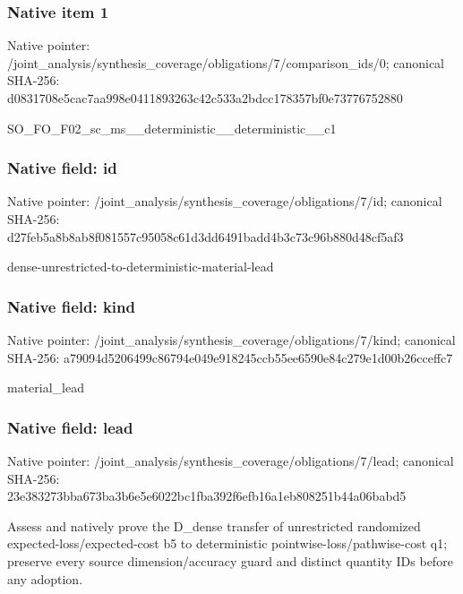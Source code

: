 \documentclass[10pt,a4paper]{article}
\begin{document}
\subsubsection{Native item 1}
Native pointer: /joint\_\allowbreak{}analysis/synthesis\_\allowbreak{}coverage/obligations/7/comparison\_\allowbreak{}ids/0; canonical SHA-256: d0831708e5cac7aa998e0411893263c42c533a2bdcc178357bf0e73776752880

\begingroup\raggedright\sloppy SO\_\allowbreak{}FO\_\allowbreak{}F02\_\allowbreak{}sc\_\allowbreak{}ms\_\allowbreak{}\_\allowbreak{}deterministic\_\allowbreak{}\_\allowbreak{}deterministic\_\allowbreak{}\_\allowbreak{}c1\par\endgroup

\subsubsection{Native field: id}
Native pointer: /joint\_\allowbreak{}analysis/synthesis\_\allowbreak{}coverage/obligations/7/id; canonical SHA-256: d27feb5a8b8ab8f081557c95058c61d3dd6491badd4b3c73c96b880d48cf5af3

\begingroup\raggedright\sloppy dense-unrestricted-to-deterministic-material-lead\par\endgroup

\subsubsection{Native field: kind}
Native pointer: /joint\_\allowbreak{}analysis/synthesis\_\allowbreak{}coverage/obligations/7/kind; canonical SHA-256: a79094d5206499c86794e049e918245ccb55ee6590e84c279e1d00b26cceffc7

\begingroup\raggedright\sloppy material\_\allowbreak{}lead\par\endgroup

\subsubsection{Native field: lead}
Native pointer: /joint\_\allowbreak{}analysis/synthesis\_\allowbreak{}coverage/obligations/7/lead; canonical SHA-256: 23e383273bba673ba3b6e5e6022bc1fba392f6efb16a1eb808251b44a06babd5

\begingroup\raggedright\sloppy Assess and natively prove the D\_\allowbreak{}dense transfer of unrestricted randomized expected-loss/\allowbreak{}expected-cost b5 to deterministic pointwise-loss/\allowbreak{}pathwise-cost q1;\allowbreak{} preserve every source dimension/\allowbreak{}accuracy guard and distinct quantity IDs before any adoption.\par\endgroup
\end{document}
